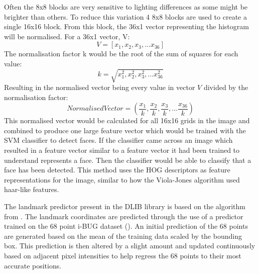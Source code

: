 \documentclass{l4proj}
\begin{document}
Often the 8x8 blocks are very sensitive to lighting differences as some might be brighter than others. To reduce this variation 4 8x8 blocks are used to create a single 16x16 block. From this block, the 36x1 vector representing the histogram will be normalised. For a 36x1 vector, V:
\[V=[x_1,x_2,x_3,...x_{36}]\]
The normalisation factor k would be the root of the sum of squares for each value:
\[ k = \sqrt{x_1^2,x_2^2,x_3^2,...x_{36}^2} \]
Resulting in the normalised vector being every value in vector \(V\) divided by the normalisation factor:
\[Normalised Vector = (\frac{x_1}{k},\frac{x_2}{k},\frac{x_3}{k},...\frac{x_{36}}{k})\]
This normalised vector would be calculated for all 16x16 grids in the image and combined to produce one large feature vector which would be trained with the SVM classifier to detect faces. If the classifier came across an image which resulted in a feature vector similar to a feature vector it had been trained to understand represents a face. Then the classifier would be able to classify that a face has been detected. This method uses the HOG descriptors as feature representations for the image, similar to how the Viola-Jones algorithm used haar-like features.

The landmark predictor present in the DLIB library is based on the algorithm from \cite{onemilli}. The landmark coordinates are predicted through the use of a predictor trained on the 68 point i-BUG dataset (\cite{300w}). An initial prediction of the 68 points are generated based on the mean of the training data scaled by the bounding box. This prediction is then altered by a slight amount and updated continuously based on adjacent pixel intensities to help regress the 68 points to their most accurate positions.
\end{document}
